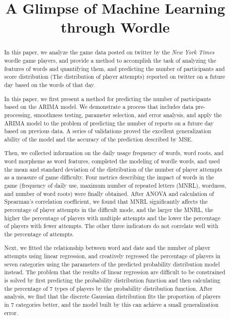 \documentclass[12pt]{article}  %
\title{A Glimpse of Machine Learning through Wordle}  %
\begin{document}
\begin{abstract}
	In this paper, we analyze the game data posted on twitter by the \emph{New York Times} wordle game players, and provide a method to accomplish the task of analyzing the features of words and quantifying them, and predicting the number of participants and score distribution (The distribution of player attempts) reported on twitter on a future day based on the words of that day.

In this paper, we first present a method for predicting the number of participants based on the ARIMA model. We demonstrate a process that includes data pre-processing, smoothness testing, parameter selection, and error analysis, and apply the ARIMA model to the problem of predicting the number of reports on a future day based on previous data. A series of validations proved the excellent generalization ability of the model and the accuracy of the prediction described by MSE.

Then, we collected information on the daily usage frequency of words, word roots, and word morpheme as word features, completed the modeling of wordle words, and used the mean and standard deviation of the distribution of the number of player attempts as a measure of game difficulty. Four metrics describing the impact of words in the game (frequency of daily use, maximum number of repeated letters (MNRL), wordness, and number of word roots) were finally obtained. After ANOVA and calculation of Spearman's correlation coefficient, we found that MNRL significantly affects the percentage of player attempts in the difficult mode, and the larger the MNRL, the higher the percentage of players with multiple attempts and the lower the percentage of players with fewer attempts. The other three indicators do not correlate well with the percentage of attempts.

Next, we fitted the relationship between word and date and the number of player attempts using linear regression, and creatively regressed the percentage of players in seven categories using the parameters of the predicted probability distribution model instead. The problem that the results of linear regression are difficult to be constrained is solved by first predicting the probability distribution function and then calculating the percentage of 7 types of players by the probability distribution function. After analysis, we find that the discrete Gaussian distribution fits the proportion of players in 7 categories better, and the model built by this can achieve a small generalization error.


\end{abstract}
\end{document}
